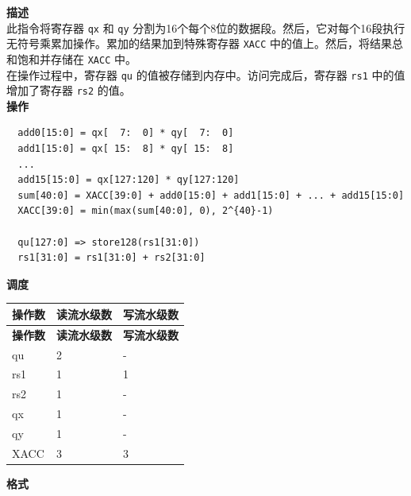 \textbf{描述}\\

此指令将寄存器 \lstinline{qx} 和 \lstinline{qy} 分割为16个每个8位的数据段。然后，它对每个16段执行无符号乘累加操作。累加的结果加到特殊寄存器 \lstinline{XACC} 中的值上。然后，将结果总和饱和并存储在 \lstinline{XACC} 中。\\ 在操作过程中，寄存器 \lstinline{qu} 的值被存储到内存中。访问完成后，寄存器 \lstinline{rs1} 中的值增加了寄存器 \lstinline{rs2} 的值。\\
\textbf{操作}
\begin{lstlisting}
  add0[15:0] = qx[  7:  0] * qy[  7:  0]
  add1[15:0] = qx[ 15:  8] * qy[ 15:  8]
  ...
  add15[15:0] = qx[127:120] * qy[127:120]
  sum[40:0] = XACC[39:0] + add0[15:0] + add1[15:0] + ... + add15[15:0]
  XACC[39:0] = min(max(sum[40:0], 0), 2^{40}-1)

  qu[127:0] => store128(rs1[31:0])
  rs1[31:0] = rs1[31:0] + rs2[31:0]
\end{lstlisting}

\textbf{调度}\\
\begin{longtable}[c]{|l|l|l|}
    \hline
    \rowcolor{lightgray}
    \textbf{操作数} & \textbf{读流水级数} & \textbf{写流水级数} \\\hline
    \endfirsthead
    \hline
    \rowcolor{lightgray}
     \textbf{操作数} & \textbf{读流水级数} & \textbf{写流水级数} \\\hline
    \endhead
    \hline
    \endfoot

    qu & 2 & - \\\hline
    rs1 & 1 & 1 \\\hline
    rs2 & 1 & - \\\hline
     qx & 1 & - \\\hline
     qy & 1 & - \\\hline
     XACC & 3 & 3

\end{longtable}

\textbf{格式}\\

